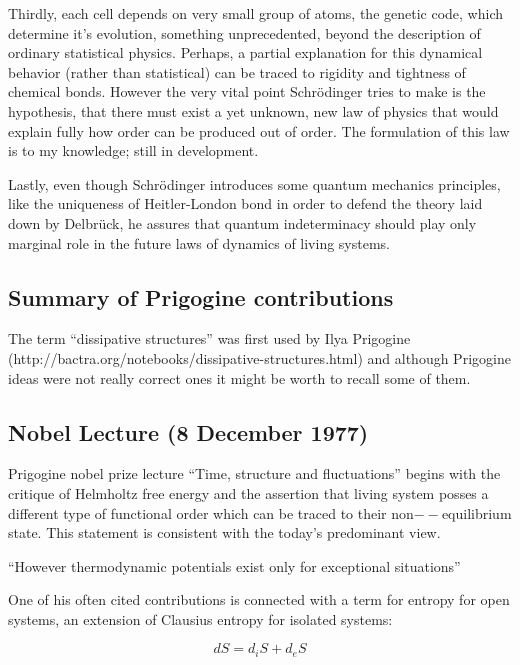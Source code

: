 \documentclass[a4paper,12pt,nofootinbib]{article}
\begin{document}
Thirdly, each cell depends on very small group of atoms, the genetic code, which determine it's evolution, something unprecedented, beyond the description
of ordinary statistical physics. Perhaps, a partial explanation for this dynamical behavior (rather than statistical) can be traced to rigidity and
tightness of chemical bonds. However the very vital point Schr{\" o}dinger tries to make is the hypothesis, that there must exist a yet unknown,
new law of physics that would explain fully how order can be produced out of order. The formulation of this law is to my knowledge; still in development.

Lastly, even though Schr{\" o}dinger introduces some quantum mechanics principles, like the uniqueness of Heitler-London bond in order to defend
the theory laid down by Delbr{\" u}ck, he assures that quantum indeterminacy should play only marginal role in the future laws of dynamics of living
systems.

\subsection{Summary of Prigogine contributions}

The term {``}dissipative structures{''} was first used by Ilya Prigogine (http://bactra.org/notebooks/dissipative-structures.html) and although Prigogine ideas were not really correct ones it might be worth to recall some of them.

\subsection*{Nobel Lecture (8 December 1977)}

Prigogine nobel prize lecture {``}Time, structure and fluctuations{''} begins with the critique of Helmholtz free energy and the assertion that living
system posses a different type of functional order which can be traced to their non$--$equilibrium state. This statement is consistent with the today{'}s predominant view.

{``}However thermodynamic potentials exist only for exceptional situations{''}

One of his often cited contributions is connected with a term for entropy for open systems, an extension of Clausius entropy for isolated systems:

\begin{displaymath}
	dS=d_iS+d_eS
\end{displaymath}
\end{document}
